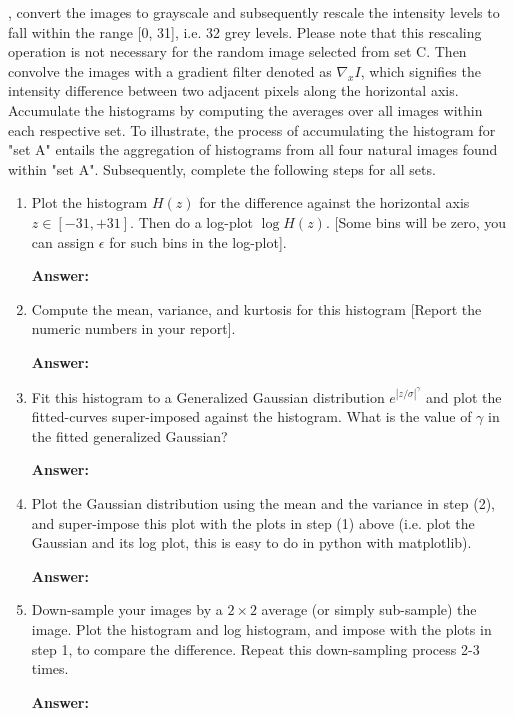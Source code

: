 \documentclass[11pt]{article}
\newcommand{\Answer}{\color{red}\textbf{Answer:} \color{black}}
\begin{document}
, convert the images to grayscale and subsequently rescale the intensity levels to fall within the range [0, 31], i.e. 32 grey levels. Please note that this rescaling operation is not necessary for the random image selected from set C. Then convolve the images with a gradient filter denoted as $\nabla_x I$, which signifies the intensity difference between two adjacent pixels along the horizontal axis. 
Accumulate the histograms by computing the averages over all images within each respective set. To illustrate, the process of accumulating the histogram for "set A" entails the aggregation of histograms from all four natural images found within "set A". Subsequently, complete the following steps for all sets.

\begin{enumerate}
\item Plot the histogram $H(z)$ for the difference against the horizontal axis $z \in [-31, +31]$. Then do a log-plot $\log H(z)$. [Some bins will be zero, you can assign $\epsilon$ for such bins in the log-plot]. 

\Answer

\item Compute the mean, variance, and kurtosis for this histogram [Report the numeric numbers in your report].

\Answer

\item Fit this histogram to a Generalized Gaussian distribution $e^{|z/\sigma|^\gamma}$ and plot the fitted-curves super-imposed against the histogram. What is the value of $\gamma$ in the fitted generalized Gaussian?

\Answer

\item Plot the Gaussian distribution using the mean and the variance in step (2), and super-impose this plot with the plots in step (1) above (i.e. plot the Gaussian and its log plot, this is easy to do in python with matplotlib).

\Answer

\item Down-sample your images by a $2\times 2$ average (or simply sub-sample) the image. Plot the histogram and log histogram, and impose with the plots in step 1, to compare the difference. Repeat this down-sampling process 2-3 times. 

\Answer

\end{enumerate}
\end{document}
